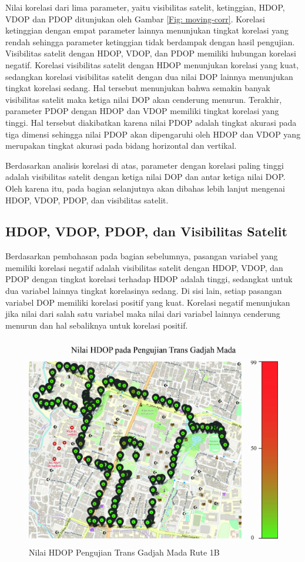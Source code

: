 Nilai korelasi dari lima parameter, yaitu visibilitas satelit, ketinggian, HDOP, VDOP dan PDOP ditunjukan oleh Gambar \ref{Fig: moving-corr}. Korelasi ketinggian dengan empat parameter lainnya menunjukan tingkat korelasi yang rendah sehingga parameter ketinggian tidak berdampak dengan hasil pengujian.  Visibilitas satelit dengan HDOP, VDOP, dan PDOP memiliki hubungan korelasi negatif. Korelasi visibilitas satelit dengan HDOP menunjukan korelasi yang kuat, sedangkan korelasi visibilitas satelit dengan dua nilai DOP lainnya menunjukan tingkat korelasi sedang. Hal tersebut menunjukan bahwa semakin banyak visibilitas satelit maka ketiga nilai DOP akan cenderung menurun. Terakhir, parameter PDOP dengan HDOP dan VDOP memiliki tingkat korelasi yang tinggi. Hal tersebut diakibatkan karena nilai PDOP adalah tingkat akurasi pada tiga dimensi sehingga nilai PDOP akan dipengaruhi oleh HDOP dan VDOP yang merupakan tingkat akurasi pada bidang horizontal dan vertikal.

Berdasarkan analisis korelasi di atas, parameter dengan korelasi paling tinggi adalah visibilitas satelit dengan ketiga nilai DOP dan antar ketiga nilai DOP. Oleh karena itu, pada bagian selanjutnya akan dibahas lebih lanjut mengenai HDOP, VDOP, PDOP, dan visibilitas satelit. 

\subsection{HDOP, VDOP, PDOP, dan Visibilitas Satelit}

Berdasarkan pembahasan pada bagian sebelumnya, pasangan variabel yang memiliki korelasi negatif adalah visibilitas satelit dengan HDOP, VDOP, dan PDOP dengan tingkat korelasi terhadap HDOP adalah tinggi, sedangkat untuk dua variabel lainnya tingkat korelasinya sedang. Di sisi lain, setiap pasangan variabel DOP memiliki korelasi positif yang kuat. Korelasi negatif menunjukan jika nilai dari salah satu variabel maka nilai dari variabel lainnya cenderung menurun dan hal sebaliknya untuk korelasi positif.

\begin{figure}[H]
	\centering
	\includegraphics[width=12cm]{contents/chapter-4/pengujian-bergerak/moving-HDOP.jpg}
	\caption{Nilai HDOP Pengujian Trans Gadjah Mada Rute 1B}
	\label{Fig: moving-hdop}
\end{figure}


